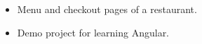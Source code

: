 % 
% 
% 
% 
% 
% 
% 


% 
% 
% 
% 
% 
% 
% 




\begin{itemize}

\item Menu and checkout pages of a restaurant.

\item Demo project for learning Angular.

\end{itemize}

\begin{footnotesize}
\end{footnotesize}










 
